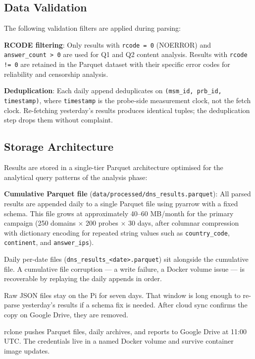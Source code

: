 \subsection{Data Validation}
\label{subsec:3.4.3}

The following validation filters are applied during parsing:

\textbf{RCODE filtering}: Only results with \texttt{rcode = 0} (NOERROR) and \texttt{answer\_count > 0} are used for Q1 and Q2 content analysis. Results with \texttt{rcode != 0} are retained in the Parquet dataset with their specific error codes for reliability and censorship analysis.

\textbf{Deduplication}: Each daily append deduplicates on \texttt{(msm\_id, prb\_id, timestamp)}, where \texttt{timestamp} is the probe-side measurement clock, not the fetch clock. Re-fetching yesterday's results produces identical tuples; the deduplication step drops them without complaint.

\subsection{Storage Architecture}
\label{subsec:3.4.4}

Results are stored in a single-tier Parquet architecture optimised for the analytical query patterns of the analysis phase:

\textbf{Cumulative Parquet file} (\texttt{data/processed/dns\_results.parquet}): All parsed results are appended daily to a single Parquet file using pyarrow with a fixed schema. This file grows at approximately 40--60 MB/month for the primary campaign (250 domains $\times$ 200 probes $\times$ 30 days, after columnar compression with dictionary encoding for repeated string values such as \texttt{country\_code}, \texttt{continent}, and \texttt{answer\_ips}).

Daily per-date files (\texttt{dns\_results\_<date>.parquet}) sit alongside the cumulative file. A cumulative file corruption --- a write failure, a Docker volume issue --- is recoverable by replaying the daily appends in order.

Raw JSON files stay on the Pi for seven days. That window is long enough to re-parse yesterday's results if a schema fix is needed. After cloud sync confirms the copy on Google Drive, they are removed.

rclone pushes Parquet files, daily archives, and reports to Google Drive at 11:00 UTC. The credentials live in a named Docker volume and survive container image updates.

